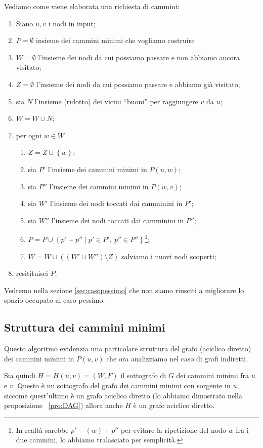 \documentclass[a4paper,10pt]{amsbook}
\theoremstyle{plain}
\theoremstyle{definition}
\theoremstyle{remark}
\newcommand{\set}[1]{\left\{#1\right\}}
\newcommand{\pa}[1]{\left(#1\right)}
\begin{document}
Vediamo come viene elaborata una richiesta di cammini:
\begin{enumerate}
\item Siano $u,v$ i nodi in input;
\item $P = \emptyset$ insieme dei cammini minimi che vogliamo costruire
\item $W = \emptyset$ l'insieme dei nodi da cui possiamo passare e non
  abbiamo ancora visitato;
\item $Z = \emptyset$ l'insieme dei nodi da cui possiamo passare e
  abbiamo gi\`a visitato;
\item sia $N$ l'insieme (ridotto) dei vicini ``buoni'' per raggiungere
  $v$ da $u$;
\item $W = W \cup N$;
\item per ogni $w \in W$
  \begin{enumerate}
  \item $Z = Z \cup \set{w}$;
  \item sia $P'$ l'insieme dei cammini minimi in $P(u,w)$;
  \item sia $P''$ l'insieme dei cammini minimi in $P(w,v)$;
  \item sia $W'$ l'insieme dei nodi toccati dai camminini in $P'$;
  \item sia $W''$ l'insieme dei nodi toccati dai camminini in $P''$;
  \item $P = P \cup \set{ p' + p'' \mid p' \in P' , \ p'' \in
      P''}$\footnote{In realtà sarebbe $p' - (w) + p''$ per evitare la
      ripetizione del nodo $w$ fra i due cammini, lo abbiamo
      tralasciato per semplicit\`a.};
  \item $W = W \cup \pa{ \pa{ W' \cup W'' } \setminus Z }$ salviamo i
    nuovi nodi scoperti;
  \end{enumerate}
\item resitituisci $P$.
\end{enumerate}

Vedremo nella sezione \ref{sec:casopessimo} che non siamo riusciti a
migliorare lo spazio occupato al caso pessimo.

\subsection{Struttura dei cammini minimi}

Questo algoritmo evidenzia una particolare struttura del grafo
(aciclico diretto) dei cammini minimi in $P(u,v)$ che ora analizziamo
nel caso di grafi indiretti.

Sia quindi $H = H(u,v) = (W,F)$ il sottografo di $G$ dei cammini
minimi fra $u$ e $v$. Questo \`e un sottografo del grafo dei cammini
minimi con sorgente in $u$, siccome quest'ultimo \`e un grafo aciclico
diretto (lo abbiamo dimostrato nella proposizione~ \ref{pro:DAG})
allora anche $H$ \`e un grafo aciclico diretto.
\end{document}
